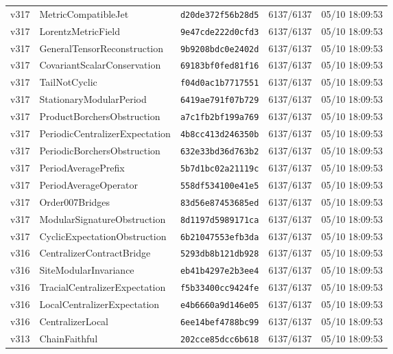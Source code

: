 \documentclass[11pt]{article}
\theoremstyle{definition}\newtheorem{deriv}{Derivação}
\begin{document}
{\begin{longtable}{@{}lllll@{}}
v317 & MetricCompatibleJet & \texttt{d20de372f56b28d5} & 6137/6137 & 05/10 18:09:53 \\
v317 & LorentzMetricField & \texttt{9e47cde222d0cfd3} & 6137/6137 & 05/10 18:09:53 \\
v317 & GeneralTensorReconstruction & \texttt{9b9208bdc0e2402d} & 6137/6137 & 05/10 18:09:53 \\
v317 & CovariantScalarConservation & \texttt{69183bf0fed81f16} & 6137/6137 & 05/10 18:09:53 \\
v317 & TailNotCyclic & \texttt{f04d0ac1b7717551} & 6137/6137 & 05/10 18:09:53 \\
v317 & StationaryModularPeriod & \texttt{6419ae791f07b729} & 6137/6137 & 05/10 18:09:53 \\
v317 & ProductBorchersObstruction & \texttt{a7c1fb2bf199a769} & 6137/6137 & 05/10 18:09:53 \\
v317 & PeriodicCentralizerExpectation & \texttt{4b8cc413d246350b} & 6137/6137 & 05/10 18:09:53 \\
v317 & PeriodicBorchersObstruction & \texttt{632e33bd36d763b2} & 6137/6137 & 05/10 18:09:53 \\
v317 & PeriodAveragePrefix & \texttt{5b7d1bc02a21119c} & 6137/6137 & 05/10 18:09:53 \\
v317 & PeriodAverageOperator & \texttt{558df534100e41e5} & 6137/6137 & 05/10 18:09:53 \\
v317 & Order007Bridges & \texttt{83d56e87453685ed} & 6137/6137 & 05/10 18:09:53 \\
v317 & ModularSignatureObstruction & \texttt{8d1197d5989171ca} & 6137/6137 & 05/10 18:09:53 \\
v317 & CyclicExpectationObstruction & \texttt{6b21047553efb3da} & 6137/6137 & 05/10 18:09:53 \\
v316 & CentralizerContractBridge & \texttt{5293db8b121db928} & 6137/6137 & 05/10 18:09:53 \\
v316 & SiteModularInvariance & \texttt{eb41b4297e2b3ee4} & 6137/6137 & 05/10 18:09:53 \\
v316 & TracialCentralizerExpectation & \texttt{f5b33400cc9424fe} & 6137/6137 & 05/10 18:09:53 \\
v316 & LocalCentralizerExpectation & \texttt{e4b6660a9d146e05} & 6137/6137 & 05/10 18:09:53 \\
v316 & CentralizerLocal & \texttt{6ee14bef4788bc99} & 6137/6137 & 05/10 18:09:53 \\
v313 & ChainFaithful & \texttt{202cce85dcc6b618} & 6137/6137 & 05/10 18:09:53 \\

\end{longtable}}
\end{document}
